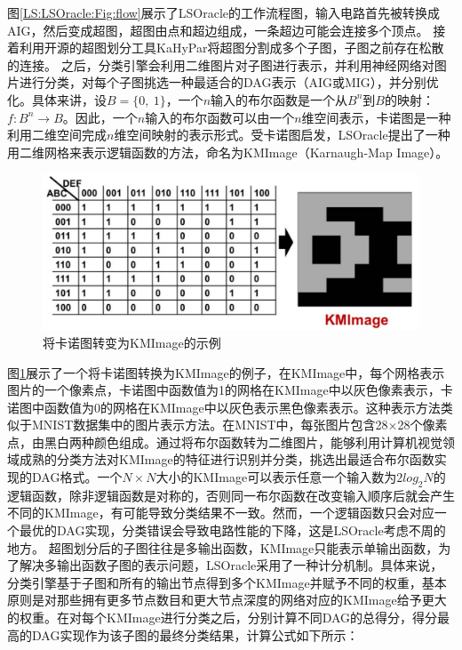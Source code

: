 图\ref{LS:LSOracle:Fig:flow}展示了LSOracle的工作流程图，输入电路首先被转换成AIG，然后变成超图，超图由点和超边组成，一条超边可能会连接多个顶点。
接着利用开源的超图划分工具KaHyPar\cite{KaHyPar}将超图分割成多个子图，子图之前存在松散的连接。
之后，分类引擎会利用二维图片对子图进行表示，并利用神经网络对图片进行分类，对每个子图挑选一种最适合的DAG表示（AIG或MIG），并分别优化。具体来讲，设$B=\{0,\ 1\}$，一个$n$输入的布尔函数是一个从$B^n$到$B$的映射：$f: B^n \rightarrow B$。因此，一个$n$输入的布尔函数可以由一个$n$维空间表示，卡诺图是一种利用二维空间完成$n$维空间映射的表示形式。受卡诺图启发，LSOracle提出了一种用二维网格来表示逻辑函数的方法，命名为KMImage（Karnaugh-Map Image）。
\begin{figure}[!htbp]
    \centering
    \includegraphics[width=0.9\linewidth]{./figs/LS-LSOracle-KMImage.png}
    \caption{将卡诺图转变为KMImage的示例}
    \label{LS:LSOracle:Fig:KMImage}
\end{figure}
图\ref{LS:LSOracle:Fig:KMImage}展示了一个将卡诺图转换为KMImage的例子，在KMImage中，每个网格表示图片的一个像素点，卡诺图中函数值为1的网格在KMImage中以灰色像素表示，卡诺图中函数值为0的网格在KMImage中以灰色表示黑色像素表示。这种表示方法类似于MNIST\cite{DNN:LeNet_MNIST}数据集中的图片表示方法。在MNIST中，每张图片包含28×28个像素点，由黑白两种颜色组成。通过将布尔函数转为二维图片，能够利用计算机视觉领域成熟的分类方法对KMImage的特征进行识别并分类，挑选出最适合布尔函数实现的DAG格式。一个$N \times N$大小的KMImage可以表示任意一个输入数为$2log_2 N$的逻辑函数，除非逻辑函数是对称的，否则同一布尔函数在改变输入顺序后就会产生不同的KMImage，有可能导致分类结果不一致。然而，一个逻辑函数只会对应一个最优的DAG实现，分类错误会导致电路性能的下降，这是LSOracle考虑不周的地方。
超图划分后的子图往往是多输出函数，KMImage只能表示单输出函数，为了解决多输出函数子图的表示问题，LSOracle采用了一种计分机制。具体来说，分类引擎基于子图和所有的输出节点得到多个KMImage并赋予不同的权重，基本原则是对那些拥有更多节点数目和更大节点深度的网络对应的KMImage给予更大的权重。在对每个KMImage进行分类之后，分别计算不同DAG的总得分，得分最高的DAG实现作为该子图的最终分类结果，计算公式如下所示：
